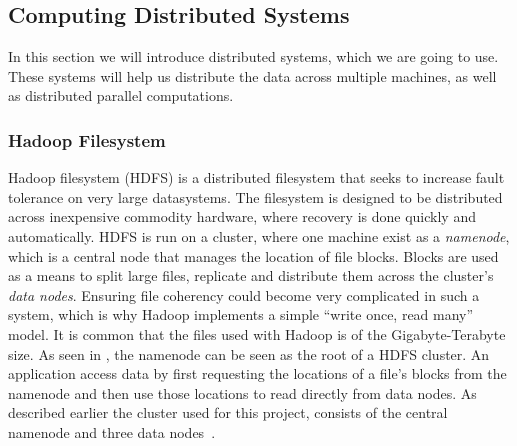 \subsection{Computing Distributed Systems}
In this section we will introduce distributed systems, which we are going to use. These systems will help us distribute the data across multiple machines, as well as distributed parallel computations. 


\subsubsection{Hadoop Filesystem}\label{sec:hadoopfilesystem}

Hadoop filesystem (HDFS) is a distributed filesystem that seeks to increase fault tolerance on very large datasystems. The filesystem is designed to be distributed across inexpensive commodity hardware, where recovery is done quickly and automatically. HDFS is run on a cluster, where one machine exist as a \emph{namenode}, which is a central node that manages the location of file blocks. Blocks are used as a means to split large files, replicate and distribute them across the cluster’s \emph{data nodes}. Ensuring file coherency could become very complicated in such a system, which is why Hadoop implements a simple “write once, read many” model. It is common that the files used with Hadoop is of the Gigabyte-Terabyte size.
As seen in , the namenode can be seen as the root of a HDFS cluster. An application access data by first requesting the locations of a file’s blocks from the namenode and then use those locations to read directly from data nodes. As described earlier the cluster used for this project, consists of the central namenode and three data nodes~\cite{hadoopIntro}. 

